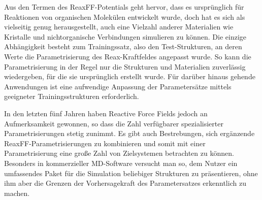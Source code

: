 Aus den Termen des ReaxFF-Potentials geht hervor, dass es ursprünglich für Reaktionen von organischen Molekülen entwickelt wurde, doch hat es sich als vielseitig genug herausgestellt, auch eine Vielzahl anderer Materialien wie Kristalle und nichtorganische Verbindungen simulieren zu können.
Die einzige Abhängigkeit besteht zum Trainingssatz, also den Test-Strukturen, an deren Werte die Parametrisierung des Reax-Kraftfeldes angepasst wurde.
So kann die Parametrisierung in der Regel nur die Strukturen und Materialien zuverlässig wiedergeben, für die sie ursprünglich erstellt wurde.
Für darüber hinaus gehende Anwendungen ist eine aufwendige Anpassung der Parametersätze mittels geeigneter Trainingsstrukturen erforderlich.

In den letzten fünf Jahren haben Reactive Force Fields jedoch an Aufmerksamkeit gewonnen, so dass die Zahl verfügbarer spezialisierter Parametrisierungen stetig zunimmt.
Es gibt auch Bestrebungen, sich ergänzende ReaxFF-Parametrisierungen zu kombinieren und somit mit einer Parametrisierung eine große Zahl von Zielsystemen betrachten zu können.
Besonders in kommerzieller MD-Software\cite{biovia_materials_2014} versucht man so, dem Nutzer ein umfassendes Paket für die Simulation beliebiger Strukturen zu präsentieren, ohne ihm aber die Grenzen der Vorhersagekraft des Parametersatzes erkenntlich zu machen.
